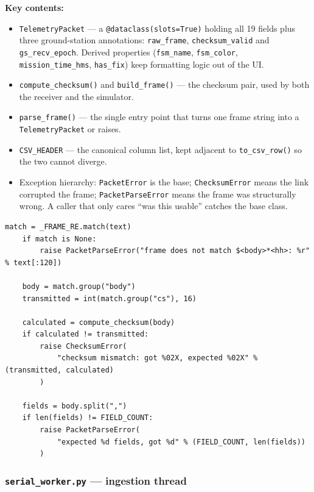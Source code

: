 \documentclass[11pt,a4paper]{article}
\newcommand{\file}[1]{\texttt{#1}}
\newcommand{\code}[1]{\texttt{#1}}
\begin{document}
\textbf{Key contents:}
\begin{itemize}
  \item \code{TelemetryPacket} --- a \code{@dataclass(slots=True)} holding all
        19 fields plus three ground-station annotations:
        \code{raw\_frame}, \code{checksum\_valid} and \code{gs\_recv\_epoch}.
        Derived properties (\code{fsm\_name}, \code{fsm\_color},
        \code{mission\_time\_hms}, \code{has\_fix}) keep formatting logic out
        of the UI.
  \item \code{compute\_checksum()} and \code{build\_frame()} --- the checksum
        pair, used by both the receiver and the simulator.
  \item \code{parse\_frame()} --- the single entry point that turns one frame
        string into a \code{TelemetryPacket} or raises.
  \item \code{CSV\_HEADER} --- the canonical column list, kept adjacent to
        \code{to\_csv\_row()} so the two cannot diverge.
  \item Exception hierarchy: \code{PacketError} is the base;
        \code{ChecksumError} means the link corrupted the frame;
        \code{PacketParseError} means the frame was structurally wrong. A
        caller that only cares ``was this usable'' catches the base class.
\end{itemize}

\begin{lstlisting}[caption={Packet validation flow, from \code{parse\_frame()}.},label={lst:parse}]
    match = _FRAME_RE.match(text)
    if match is None:
        raise PacketParseError("frame does not match $<body>*<hh>: %r" % text[:120])

    body = match.group("body")
    transmitted = int(match.group("cs"), 16)

    calculated = compute_checksum(body)
    if calculated != transmitted:
        raise ChecksumError(
            "checksum mismatch: got %02X, expected %02X" % (transmitted, calculated)
        )

    fields = body.split(",")
    if len(fields) != FIELD_COUNT:
        raise PacketParseError(
            "expected %d fields, got %d" % (FIELD_COUNT, len(fields))
        )
\end{lstlisting}

\subsubsection{\file{serial\_worker.py} --- ingestion thread}
\end{document}
